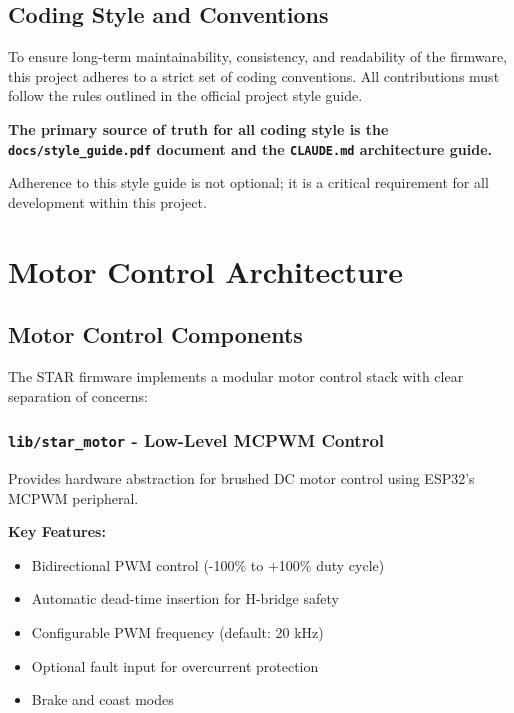 \documentclass[11pt,letterpaper]{article}
\begin{document}
\subsection{Coding Style and Conventions}
To ensure long-term maintainability, consistency, and readability of the firmware, this project adheres to a strict set of coding conventions. All contributions must follow the rules outlined in the official project style guide.

\textbf{The primary source of truth for all coding style is the \texttt{docs/style\_guide.pdf} document and the \texttt{CLAUDE.md} architecture guide.}

Adherence to this style guide is not optional; it is a critical requirement for all development within this project.

\section{Motor Control Architecture}

\subsection{Motor Control Components}

The STAR firmware implements a modular motor control stack with clear separation of concerns:

\subsubsection{\texttt{lib/star\_motor} - Low-Level MCPWM Control}

Provides hardware abstraction for brushed DC motor control using ESP32's MCPWM peripheral.

\textbf{Key Features:}
\begin{itemize}
    \item Bidirectional PWM control (-100\% to +100\% duty cycle)
    \item Automatic dead-time insertion for H-bridge safety
    \item Configurable PWM frequency (default: 20 kHz)
    \item Optional fault input for overcurrent protection
    \item Brake and coast modes
\end{itemize}
\end{document}
